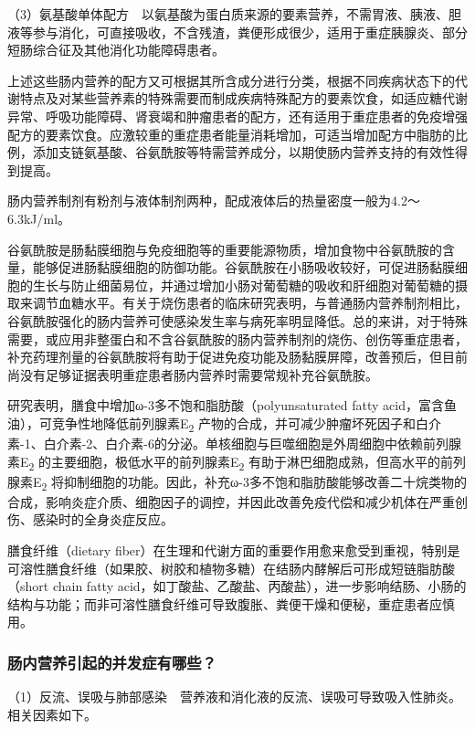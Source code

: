 （3）氨基酸单体配方　以氨基酸为蛋白质来源的要素营养，不需胃液、胰液、胆液等参与消化，可直接吸收，不含残渣，粪便形成很少，适用于重症胰腺炎、部分短肠综合征及其他消化功能障碍患者。

上述这些肠内营养的配方又可根据其所含成分进行分类，根据不同疾病状态下的代谢特点及对某些营养素的特殊需要而制成疾病特殊配方的要素饮食，如适应糖代谢异常、呼吸功能障碍、肾衰竭和肿瘤患者的配方，还有适用于重症患者的免疫增强配方的要素饮食。应激较重的重症患者能量消耗增加，可适当增加配方中脂肪的比例，添加支链氨基酸、谷氨酰胺等特需营养成分，以期使肠内营养支持的有效性得到提高。

肠内营养制剂有粉剂与液体制剂两种，配成液体后的热量密度一般为4.2～6.3kJ/ml。

谷氨酰胺是肠黏膜细胞与免疫细胞等的重要能源物质，增加食物中谷氨酰胺的含量，能够促进肠黏膜细胞的防御功能。谷氨酰胺在小肠吸收较好，可促进肠黏膜细胞的生长与防止细菌易位，并通过增加小肠对葡萄糖的吸收和肝细胞对葡萄糖的摄取来调节血糖水平。有关于烧伤患者的临床研究表明，与普通肠内营养制剂相比，谷氨酰胺强化的肠内营养可使感染发生率与病死率明显降低。总的来讲，对于特殊需要，或应用非整蛋白和不含谷氨酰胺的肠内营养制剂的烧伤、创伤等重症患者，补充药理剂量的谷氨酰胺将有助于促进免疫功能及肠黏膜屏障，改善预后，但目前尚没有足够证据表明重症患者肠内营养时需要常规补充谷氨酰胺。

研究表明，膳食中增加ω-3多不饱和脂肪酸（polyunsaturated fatty
acid，富含鱼油），可竞争性地降低前列腺素E\textsubscript{2}
产物的合成，并可减少肿瘤坏死因子和白介素-1、白介素-2、白介素-6的分泌。单核细胞与巨噬细胞是外周细胞中依赖前列腺素E\textsubscript{2}
的主要细胞，极低水平的前列腺素E\textsubscript{2}
有助于淋巴细胞成熟，但高水平的前列腺素E\textsubscript{2}
将抑制细胞的功能。因此，补充ω-3多不饱和脂肪酸能够改善二十烷类物的合成，影响炎症介质、细胞因子的调控，并因此改善免疫代偿和减少机体在严重创伤、感染时的全身炎症反应。

膳食纤维（dietary
fiber）在生理和代谢方面的重要作用愈来愈受到重视，特别是可溶性膳食纤维（如果胶、树胶和植物多糖）在结肠内酵解后可形成短链脂肪酸（short
chain fatty
acid，如丁酸盐、乙酸盐、丙酸盐），进一步影响结肠、小肠的结构与功能；而非可溶性膳食纤维可导致腹胀、粪便干燥和便秘，重症患者应慎用。

\subsubsection{肠内营养引起的并发症有哪些？}

（1）反流、误吸与肺部感染　营养液和消化液的反流、误吸可导致吸入性肺炎。相关因素如下。

